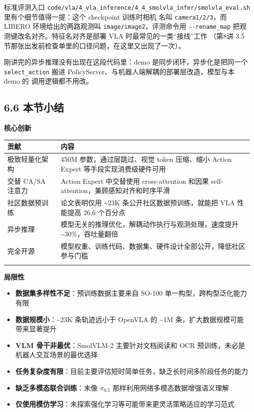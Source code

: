 \documentclass[
  chinese,
]{ctexart}
\providecommand{\tightlist}{%
  \setlength{\itemsep}{0pt}\setlength{\parskip}{0pt}}
\begin{document}
标准评测入口
\texttt{code/vla/4\_vla\_inference/4\_4\_smolvla\_infer/smolvla\_eval.sh}
里有个细节值得一提：这个 checkpoint 训练时相机 名叫
\texttt{camera1/2/3}，而 LIBERO 环境给出的两路观测叫
\texttt{image/image2}，评测命令用 \texttt{-\/-rename\_map}
把观测键改名对齐。特征名对齐是部署 VLA 时最常见的一类``接线''工作
（第8讲 3.5 节那张出发前检查单里的口径问题，在这里又出现了一次）。

刚讲完的异步推理没有出现在这段代码里：demo 是同步闭环，异步化是把同一个
\texttt{select\_action} 搬进
PolicyServer、与机器人端解耦的部署层改造，模型与本 demo 的
调用逻辑都不用改。

\subsection{6.6 本节小结}\label{ux672cux8282ux5c0fux7ed3-4}

\textbf{核心创新}

\begin{center}
\begin{tabular}{@{}>{\raggedright\arraybackslash}p{} >{\raggedright\arraybackslash}p{}@{}}
\toprule\noalign{}
贡献 & 内容 \\
\midrule\noalign{}
极致轻量化架构 & 450M 参数，通过层跳过、视觉 token 压缩、缩小 Action Expert 等手段实现消费级硬件可用 \\
交替 CA/SA 注意力 & Action Expert 中交替使用 cross-attention 和因果 self-attention，兼顾感知对齐和时序平滑 \\
社区数据预训练 & 论文表明仅用 \textasciitilde23K 条公开社区数据预训练，就能把 VLA 性能提高 26.6 个百分点 \\
异步推理 & 模型无关的推理优化，解耦动作执行与观测处理，速度提升 \textasciitilde30\%，吞吐量翻倍 \\
完全开源 & 模型权重、训练代码、数据集、硬件设计全部公开，降低社区参与门槛 \\
\bottomrule\noalign{}
\end{tabular}
\end{center}

\textbf{局限性}

\begin{itemize}
\tightlist
\item
  \textbf{数据集多样性不足}：预训练数据主要来自 SO-100
  单一构型，跨构型泛化能力有限
\item
  \textbf{数据规模小}：\textasciitilde23K 条轨迹远小于 OpenVLA 的
  \textasciitilde1M 条，扩大数据规模可能带来显著提升
\item
  \textbf{VLM 骨干非最优}：SmolVLM-2 主要针对文档阅读和 OCR
  预训练，未必是机器人交互场景的最优选择
\item
  \textbf{任务复杂度有限}：目前主要评估短时简单任务，缺乏长时间多阶段任务的能力
\item
  \textbf{缺乏多模态联合训练}：未像 \(\pi_{0.5}\)
  那样利用网络多模态数据增强语义理解
\item
  \textbf{仅使用模仿学习}：未探索强化学习等可能带来更灵活策略适应的学习范式
\end{itemize}
\end{document}
